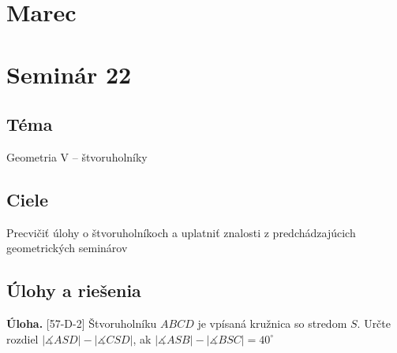 \documentclass[11pt,a4paper,oneside,final]{book}
\newcommand{\ul}{\textbf{Úloha.} }
\newcommand{\ma}{\measuredangle}
\begin{document}
\section{Marec}
\section*{Seminár 22}
\subsection*{Téma}
Geometria V -- štvoruholníky

\subsection*{Ciele}
Precvičiť úlohy o štvoruholníkoch a uplatniť znalosti z predchádzajúcich geometrických seminárov

\subsection*{Úlohy a riešenia}
\begin{tcolorbox}[breakable,notitle,boxrule=0pt,colback=light-gray,colframe=light-gray]\ul [57-D-2] Štvoruholníku $ABCD$ je vpísaná kružnica so stredom $S$. Určte rozdiel $|\ma ASD|- |\ma CSD|$, ak $|\ma ASB| - |\ma BSC| = 40^\circ$

\end{tcolorbox}
\end{document}

